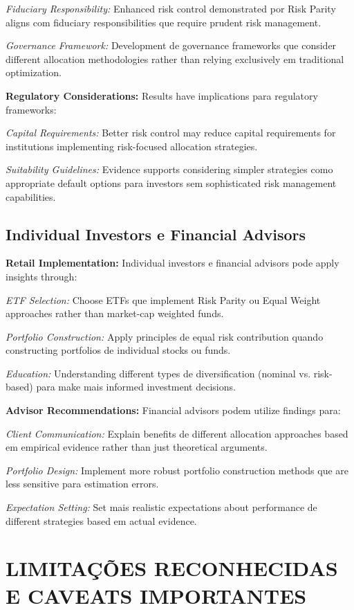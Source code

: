 \textit{Fiduciary Responsibility:} Enhanced risk control demonstrated por Risk Parity aligns com fiduciary responsibilities que require prudent risk management.

\textit{Governance Framework:} Development de governance frameworks que consider different allocation methodologies rather than relying exclusively em traditional optimization.

\textbf{Regulatory Considerations:} Results have implications para regulatory frameworks:

\textit{Capital Requirements:} Better risk control may reduce capital requirements for institutions implementing risk-focused allocation strategies.

\textit{Suitability Guidelines:} Evidence supports considering simpler strategies como appropriate default options para investors sem sophisticated risk management capabilities.

\subsection{Individual Investors e Financial Advisors}

\textbf{Retail Implementation:} Individual investors e financial advisors pode apply insights through:

\textit{ETF Selection:} Choose ETFs que implement Risk Parity ou Equal Weight approaches rather than market-cap weighted funds.

\textit{Portfolio Construction:} Apply principles de equal risk contribution quando constructing portfolios de individual stocks ou funds.

\textit{Education:} Understanding different types de diversification (nominal vs. risk-based) para make mais informed investment decisions.

\textbf{Advisor Recommendations:} Financial advisors podem utilize findings para:

\textit{Client Communication:} Explain benefits de different allocation approaches based em empirical evidence rather than just theoretical arguments.

\textit{Portfolio Design:} Implement more robust portfolio construction methods que are less sensitive para estimation errors.

\textit{Expectation Setting:} Set mais realistic expectations about performance de different strategies based em actual evidence.

\section{LIMITAÇÕES RECONHECIDAS E CAVEATS IMPORTANTES}

